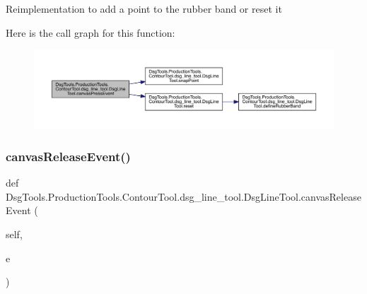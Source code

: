 \begin{DoxyVerb}Reimplementation to add a point to the rubber band or reset it
\end{DoxyVerb}
 Here is the call graph for this function\+:
\nopagebreak
\begin{figure}[H]
\begin{center}
\leavevmode
\includegraphics[width=350pt]{class_dsg_tools_1_1_production_tools_1_1_contour_tool_1_1dsg__line__tool_1_1_dsg_line_tool_a9c7fbddb2710b258921c9fe240e11dca_cgraph}
\end{center}
\end{figure}
\mbox{\label{class_dsg_tools_1_1_production_tools_1_1_contour_tool_1_1dsg__line__tool_1_1_dsg_line_tool_a52180955a23d47f8ba857dac3b55e51a}} 
\subsubsection{\texorpdfstring{canvas\+Release\+Event()}{canvasReleaseEvent()}}
{\footnotesize\ttfamily def Dsg\+Tools.\+Production\+Tools.\+Contour\+Tool.\+dsg\+\_\+line\+\_\+tool.\+Dsg\+Line\+Tool.\+canvas\+Release\+Event (\begin{DoxyParamCaption}\item[{}]{self,  }\item[{}]{e }\end{DoxyParamCaption})}


